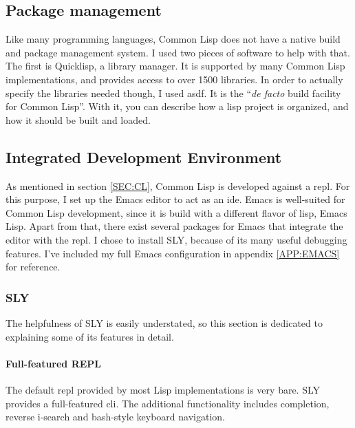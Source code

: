 
\label{SEC:DEV_ENV}

\subsection{Package management}

Like many programming languages,
Common Lisp does not have a native build and package management system.
I used two pieces of software to help with that.
The first is Quicklisp,
a library manager.
It is supported by many Common Lisp implementations,
and provides access to over 1500 libraries.\cite{quicklisp}
In order to actually specify the libraries needed though,
I used \ac{asdf}.
It is the ``\textit{de facto} build facility for Common Lisp''\cite{asdf}.
With it,
you can describe how a lisp project is organized,
and how it should be built and loaded.

\subsection{Integrated Development Environment}

As mentioned in section \ref{SEC:CL},
Common Lisp is developed against a \ac{repl}.
For this purpose,
I set up the Emacs editor to act as an \ac{ide}.
Emacs is well-suited for Common Lisp development,
since it is build with a different flavor of lisp,
Emacs Lisp.
Apart from that,
there exist several packages for Emacs that integrate the editor with the \ac{repl}.
I chose to install SLY,
because of its many useful debugging features.
I've included my full Emacs configuration in appendix \ref{APP:EMACS} for reference.

\subsubsection{SLY}

The helpfulness of SLY is easily understated,
so this section is dedicated to explaining some of its features in detail\cite{sly}.

\paragraph{Full-featured REPL}

The default \ac{repl} provided by most Lisp implementations is very bare.
SLY provides a full-featured \ac{cli}.
The additional functionality includes completion,
reverse i-search and bash-style keyboard navigation.

